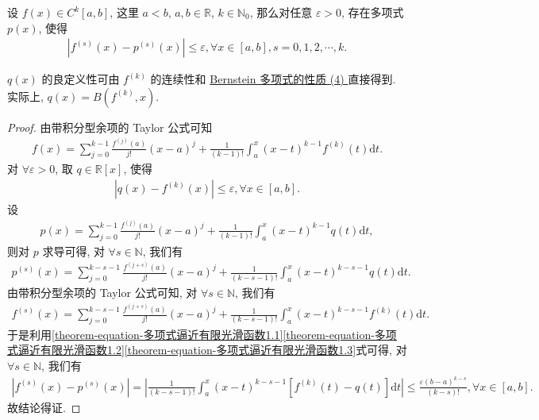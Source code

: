 \documentclass[../../main.tex]{subfiles}
\begin{document}
\begin{theorem}\label{theorem:多项式逼近有限阶光滑函数}
设 $f(x) \in C^{k}[a,b]$, 这里 $a < b$, $a,b \in \mathbb{R}$, $k \in \mathbb{N}_0$, 那么对任意 $\varepsilon > 0$, 存在多项式 $p(x)$, 使得
\begin{align*}
\left| f^{(s)}(x) - p^{(s)}(x) \right| \leqslant \varepsilon, \forall x \in [a,b], s = 0,1,2,\cdots,k.
\end{align*}
\end{theorem}
\begin{remark}
$q(x)$ 的良定义性可由 $f^{(k)}$ 的连续性和 \hyperref[theorem:Bernstein多项式的性质]{Bernstein 多项式的性质 (4) }直接得到. 实际上, $q(x) = B(f^{(k)},x)$.
\end{remark}
\begin{proof}
由带积分型余项的 Taylor 公式可知
\begin{align*}
f(x) = \sum_{j = 0}^{k - 1} \frac{f^{(j)}(a)}{j!}(x - a)^j + \frac{1}{(k - 1)!} \int_a^x (x - t)^{k - 1} f^{(k)}(t) \mathrm{d}t.
\end{align*}
对 $\forall \varepsilon > 0$, 取 $q \in \mathbb{R}[x]$, 使得
\begin{align}
|q(x) - f^{(k)}(x)| \leqslant \varepsilon, \forall x \in [a,b]. \label{theorem-equation-多项式逼近有限光滑函数1.1}
\end{align}
设
\begin{align*}
p(x) = \sum_{j = 0}^{k - 1} \frac{f^{(j)}(a)}{j!}(x - a)^j + \frac{1}{(k - 1)!} \int_a^x (x - t)^{k - 1} q(t) \mathrm{d}t,
\end{align*}
则对 $p$ 求导可得, 对 $\forall s \in \mathbb{N}$, 我们有
\begin{align}
p^{(s)}(x) = \sum_{j = 0}^{k - s - 1} \frac{f^{(j + s)}(a)}{j!}(x - a)^j + \frac{1}{(k - s - 1)!} \int_a^x (x - t)^{k - s - 1} q(t) \mathrm{d}t. \label{theorem-equation-多项式逼近有限光滑函数1.2}
\end{align}
由带积分型余项的 Taylor 公式可知, 对 $\forall s \in \mathbb{N}$, 我们有
\begin{align}
f^{(s)}(x) = \sum_{j = 0}^{k - s - 1} \frac{f^{(j + s)}(a)}{j!}(x - a)^j + \frac{1}{(k - s - 1)!} \int_a^x (x - t)^{k - s - 1} f^{(k)}(t) \mathrm{d}t.\label{theorem-equation-多项式逼近有限光滑函数1.3}
\end{align}
于是利用\eqref{theorem-equation-多项式逼近有限光滑函数1.1}\eqref{theorem-equation-多项式逼近有限光滑函数1.2}\eqref{theorem-equation-多项式逼近有限光滑函数1.3}式可得, 对 $\forall s \in \mathbb{N}$, 我们有
\begin{align*}
|f^{(s)}(x) - p^{(s)}(x)| = \left| \frac{1}{(k - s - 1)!} \int_a^x (x - t)^{k - s - 1} [f^{(k)}(t) - q(t)] \mathrm{d}t \right| \leqslant \frac{\varepsilon (b - a)^{k - s}}{(k - s)!}, \forall x \in [a,b].
\end{align*}
故结论得证.

\end{proof}
\end{document}
